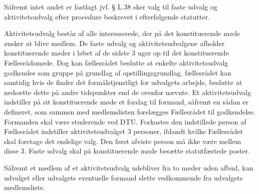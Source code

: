 \begin{list}
\item Såfremt intet andet er fastlagt jvf. § L.38 sker valg til faste udvalg og aktivitetsudvalg efter procedure
         beskrevet i efterfølgende statutter.
\item Aktivitetsudvalg består af alle interesserede, der på det konstituerende møde ønsker at blive medlem. De
           faste udvalg og aktivitetsudvalgene afholder konstituerende møder i løbet af de sidste 3 uger op til det
            konstituerende Fællesrådsmøde.
              Dog kan fællesrådet beslutte at enkelte aktivitetsudvalg godkendes som gruppe på grundlag af
                opstillingsgrundlag, fællesrådet kan samtidig hvis de finder det formålstjenstligt for udvalgets arbejde,
                  beslutte at nedsætte dette på andre tidspunkter end de ovenfor nævnte.
                    Et aktivitetsudvalg indstiller på sit konstituerende møde et forslag til formand, såfremt en sådan er defineret,
                       som sammen med medlemslisten forelægges Fællesrådet til godkendelse. Formanden skal være studerende
                          ved DTU. Forkastes den indstillede person af Fællesrådet indstiller aktivitetsudvalget 3 personer, iblandt
                           hvilke Fællesrådet skal foretage det endelige valg. Den først afviste person må ikke være mellem disse 3.
                               Faste udvalg skal på konstituerende møde besætte statutfæstede poster.
\item  Såfremt et medlem af et aktivitetsudvalg udebliver fra to møder uden afbud, kan udvalget eller udvalgets
         eventuelle formand slette vedkommende fra udvalgets medlemsliste.



\end{list}
